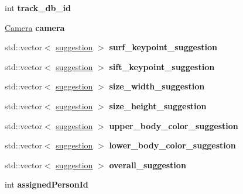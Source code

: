 \begin{DoxyCompactItemize}
\item 
\mbox{\label{structdto_1_1_track_a6ba779456353d9695f5c4c31b063ab43}} 
int {\bfseries track\+\_\+db\+\_\+id}
\item 
\mbox{\label{structdto_1_1_track_ae9f1cedb3f1b80710ccba00087310077}} 
\mbox{\hyperlink{structdto_1_1_camera}{Camera}} {\bfseries camera}
\item 
\mbox{\label{structdto_1_1_track_a7e6e2eb3e50df9ab607fda0139180eda}} 
std\+::vector$<$ \mbox{\hyperlink{structdto_1_1_track_1_1suggestion}{suggestion}} $>$ {\bfseries surf\+\_\+keypoint\+\_\+suggestion}
\item 
\mbox{\label{structdto_1_1_track_ad9da714ef8019b266b8585ce419d80a0}} 
std\+::vector$<$ \mbox{\hyperlink{structdto_1_1_track_1_1suggestion}{suggestion}} $>$ {\bfseries sift\+\_\+keypoint\+\_\+suggestion}
\item 
\mbox{\label{structdto_1_1_track_a22cdf4d7b4104987ca9fc2ae07c3a11a}} 
std\+::vector$<$ \mbox{\hyperlink{structdto_1_1_track_1_1suggestion}{suggestion}} $>$ {\bfseries size\+\_\+width\+\_\+suggestion}
\item 
\mbox{\label{structdto_1_1_track_a76c39030e3a753c2bb77d21a10f9b3c7}} 
std\+::vector$<$ \mbox{\hyperlink{structdto_1_1_track_1_1suggestion}{suggestion}} $>$ {\bfseries size\+\_\+height\+\_\+suggestion}
\item 
\mbox{\label{structdto_1_1_track_a0ef91841348036a66324c7974c2ae7c5}} 
std\+::vector$<$ \mbox{\hyperlink{structdto_1_1_track_1_1suggestion}{suggestion}} $>$ {\bfseries upper\+\_\+body\+\_\+color\+\_\+suggestion}
\item 
\mbox{\label{structdto_1_1_track_a6b5927acac3f921af07229487dbd2056}} 
std\+::vector$<$ \mbox{\hyperlink{structdto_1_1_track_1_1suggestion}{suggestion}} $>$ {\bfseries lower\+\_\+body\+\_\+color\+\_\+suggestion}
\item 
\mbox{\label{structdto_1_1_track_a978dba2d65e1e1d687d3fc54c47b3dcd}} 
std\+::vector$<$ \mbox{\hyperlink{structdto_1_1_track_1_1suggestion}{suggestion}} $>$ {\bfseries overall\+\_\+suggestion}
\item 
\mbox{\label{structdto_1_1_track_a0062705f14f14f5c77303aacdddf2614}} 
int {\bfseries assigned\+Person\+Id}
\end{DoxyCompactItemize}


